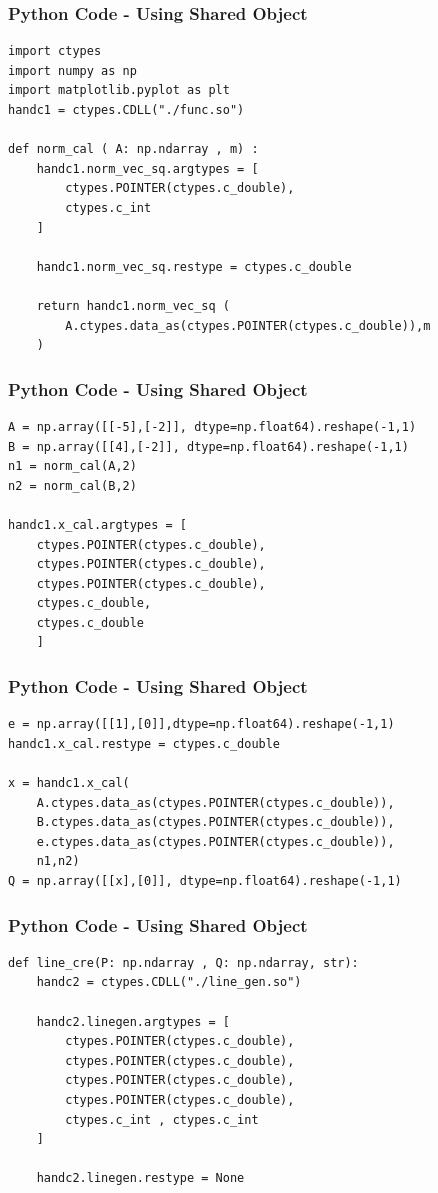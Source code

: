 \documentclass{beamer}
\begin{document}
\begin{frame}[fragile]
    \frametitle{Python Code - Using Shared Object}
    \begin{lstlisting}
import ctypes
import numpy as np
import matplotlib.pyplot as plt
handc1 = ctypes.CDLL("./func.so")

def norm_cal ( A: np.ndarray , m) :
    handc1.norm_vec_sq.argtypes = [
        ctypes.POINTER(ctypes.c_double),
        ctypes.c_int
    ]

    handc1.norm_vec_sq.restype = ctypes.c_double

    return handc1.norm_vec_sq (
        A.ctypes.data_as(ctypes.POINTER(ctypes.c_double)),m
    )
\end{lstlisting}
\end{frame}

\begin{frame}[fragile]
    \frametitle{Python Code - Using Shared Object}
    \begin{lstlisting} 
A = np.array([[-5],[-2]], dtype=np.float64).reshape(-1,1)
B = np.array([[4],[-2]], dtype=np.float64).reshape(-1,1)
n1 = norm_cal(A,2)
n2 = norm_cal(B,2)

handc1.x_cal.argtypes = [
    ctypes.POINTER(ctypes.c_double),
    ctypes.POINTER(ctypes.c_double),
    ctypes.POINTER(ctypes.c_double),
    ctypes.c_double,
    ctypes.c_double
    ]

\end{lstlisting}
\end{frame}
\begin{frame}[fragile]
    \frametitle{Python Code - Using Shared Object}
    \begin{lstlisting}
e = np.array([[1],[0]],dtype=np.float64).reshape(-1,1)
handc1.x_cal.restype = ctypes.c_double

x = handc1.x_cal(
    A.ctypes.data_as(ctypes.POINTER(ctypes.c_double)),
    B.ctypes.data_as(ctypes.POINTER(ctypes.c_double)),
    e.ctypes.data_as(ctypes.POINTER(ctypes.c_double)),
    n1,n2)
Q = np.array([[x],[0]], dtype=np.float64).reshape(-1,1)
\end{lstlisting}
\end{frame}
\begin{frame}[fragile]
    \frametitle{Python Code - Using Shared Object}
    \begin{lstlisting}
def line_cre(P: np.ndarray , Q: np.ndarray, str):
    handc2 = ctypes.CDLL("./line_gen.so")

    handc2.linegen.argtypes = [
        ctypes.POINTER(ctypes.c_double),
        ctypes.POINTER(ctypes.c_double),
        ctypes.POINTER(ctypes.c_double),
        ctypes.POINTER(ctypes.c_double),
        ctypes.c_int , ctypes.c_int
    ]

    handc2.linegen.restype = None
\end{lstlisting}
\end{frame}
\end{document}

